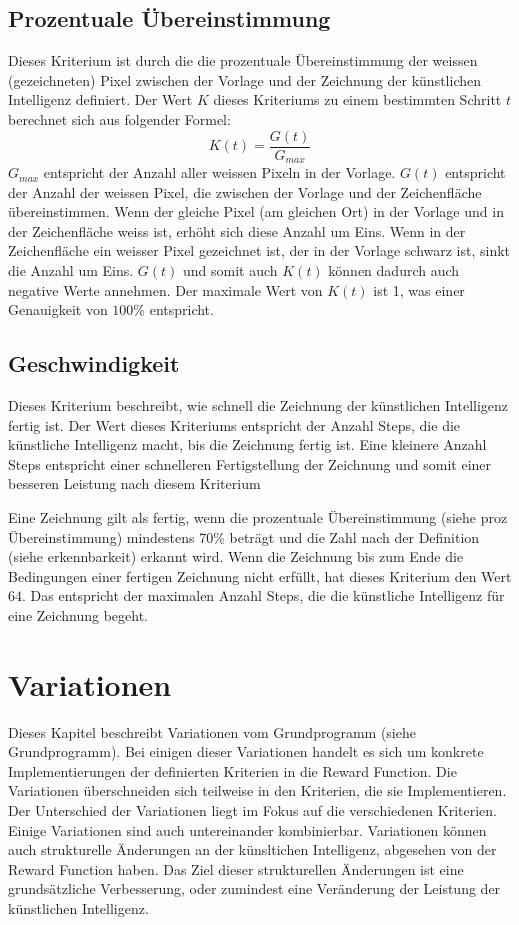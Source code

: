 \subsection{Prozentuale Übereinstimmung}
\label{sub:m_eval_proc}
Dieses Kriterium ist durch die die prozentuale Übereinstimmung der weissen
(gezeichneten) Pixel zwischen der Vorlage und der Zeichnung der künstlichen
Intelligenz definiert. Der Wert $K$ dieses Kriteriums zu einem bestimmten
Schritt $t$ berechnet sich aus folgender Formel:
\begin{equation}
  \label{eq:m_reward}
  K(t) = \frac{G(t)}{G_{max}}
\end{equation}
$G_{max}$ entspricht der Anzahl aller weissen Pixeln in der Vorlage. $G(t)$
entspricht der Anzahl der weissen Pixel, die zwischen der Vorlage und der
Zeichenfläche übereinstimmen. Wenn der gleiche Pixel (am gleichen Ort) in der
Vorlage und in der Zeichenfläche weiss ist, erhöht sich diese Anzahl um Eins.
Wenn in der Zeichenfläche ein weisser Pixel gezeichnet ist, der in der Vorlage
schwarz ist, sinkt die Anzahl um Eins. $G(t)$ und somit auch $K(t)$ können
dadurch auch negative Werte annehmen. Der maximale Wert von $K(t)$ ist 1, was
einer Genauigkeit von $100\%$ entspricht.

\subsection{Geschwindigkeit}
\label{sub:m_eval_speed}
Dieses Kriterium beschreibt, wie schnell die Zeichnung der künstlichen
Intelligenz fertig ist. Der Wert dieses Kriteriums entspricht der Anzahl Steps,
die die künstliche Intelligenz macht, bis die Zeichnung fertig ist. Eine
kleinere Anzahl Steps entspricht einer schnelleren Fertigstellung der Zeichnung
und somit einer besseren Leistung nach diesem Kriterium

Eine Zeichnung gilt als fertig, wenn die prozentuale Übereinstimmung (siehe proz
Übereinstimmung) mindestens 70\% beträgt und die Zahl nach der Definition (siehe
erkennbarkeit) erkannt wird. Wenn die Zeichnung bis zum Ende die Bedingungen
einer fertigen Zeichnung nicht erfüllt, hat dieses Kriterium den Wert $64$. Das
entspricht der maximalen Anzahl Steps, die die künstliche Intelligenz für eine
Zeichnung begeht.


\section{Variationen}
\label{chap:m_var}
Dieses Kapitel beschreibt Variationen vom Grundprogramm (siehe Grundprogramm).
Bei einigen dieser Variationen handelt es sich um konkrete Implementierungen der
definierten Kriterien in die Reward Function. Die Variationen überschneiden sich
teilweise in den Kriterien, die sie Implementieren. Der Unterschied der
Variationen liegt im Fokus auf die verschiedenen Kriterien. Einige Variationen
sind auch untereinander kombinierbar. Variationen können auch strukturelle
Änderungen an der künsltichen Intelligenz, abgesehen von der Reward Function
haben. Das Ziel dieser strukturellen Änderungen ist eine grundsätzliche
Verbesserung, oder zumindest eine Veränderung der Leistung der künstlichen
Intelligenz. 

